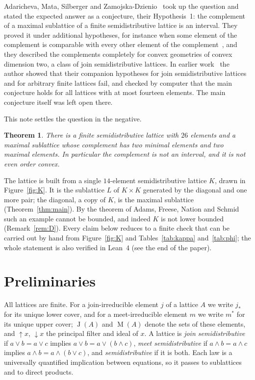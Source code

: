 \documentclass[11pt]{amsart}
\newtheorem*{maintheorem}{Theorem}
\theoremstyle{definition}
\theoremstyle{remark}
\numberwithin{equation}{section}
\newcommand{\Ji}{\operatorname{J}}
\newcommand{\Mi}{\operatorname{M}}
\newcommand{\up}{{\uparrow}}
\newcommand{\dn}{{\downarrow}}
\begin{document}
Adaricheva, Mata, Silberger and Zamojska-Dzienio~\cite{AMSZ} took up the question and stated the expected answer as a conjecture, their Hypothesis~1: the complement of a maximal sublattice of a finite semidistributive lattice is an interval. They proved it under additional hypotheses, for instance when some element of the complement is comparable with every other element of the complement~\cite[Theorem~5.5]{AMSZ}, and they described the complements completely for convex geometries of convex dimension two, a class of join semidistributive lattices. In earlier work~\cite{Bh} the author showed that their companion hypotheses for join semidistributive lattices and for arbitrary finite lattices fail, and checked by computer that the main conjecture holds for all lattices with at most fourteen elements. The main conjecture itself was left open there.

This note settles the question in the negative.

\begin{maintheorem}
There is a finite semidistributive lattice with $26$ elements and a maximal sublattice whose complement has two minimal elements and two maximal elements. In particular the complement is not an interval, and it is not even order convex.
\end{maintheorem}

The lattice is built from a single $14$-element semidistributive lattice $K$, drawn in Figure~\ref{fig:K}. It is the sublattice $L$ of $K\times K$ generated by the diagonal and one more pair; the diagonal, a copy of $K$, is the maximal sublattice (Theorem~\ref{thm:main}). By the theorem of Adams, Freese, Nation and Schmid such an example cannot be bounded, and indeed $K$ is not lower bounded (Remark~\ref{rem:D}). Every claim below reduces to a finite check that can be carried out by hand from Figure~\ref{fig:K} and Tables~\ref{tab:kappa} and~\ref{tab:phi}; the whole statement is also verified in Lean~4 (see the end of the paper).

\section{Preliminaries}

All lattices are finite. For a join-irreducible element $j$ of a lattice $A$ we write $j_*$ for its unique lower cover, and for a meet-irreducible element $m$ we write $m^*$ for its unique upper cover; $\Ji(A)$ and $\Mi(A)$ denote the sets of these elements, and $\up x$, $\dn x$ the principal filter and ideal of $x$. A lattice is \emph{join semidistributive} if $a\vee b=a\vee c$ implies $a\vee b=a\vee(b\wedge c)$, \emph{meet semidistributive} if $a\wedge b=a\wedge c$ implies $a\wedge b=a\wedge(b\vee c)$, and \emph{semidistributive} if it is both. Each law is a universally quantified implication between equations, so it passes to sublattices and to direct products.
\end{document}
